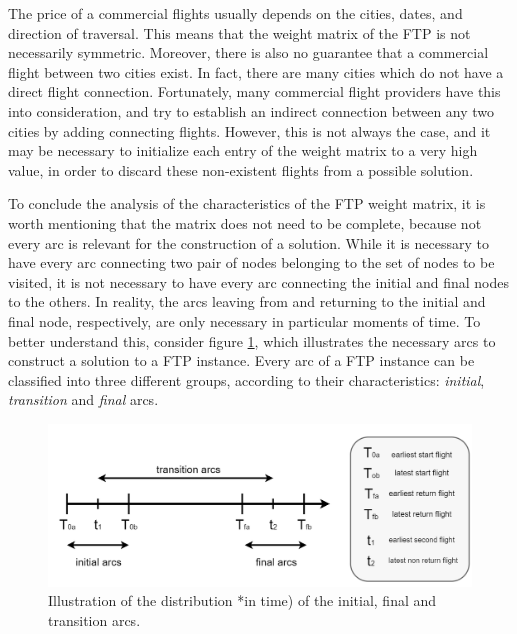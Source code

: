 The price of a commercial flights usually depends on the cities, dates, and  direction of traversal. This means that the weight matrix of the FTP is not necessarily symmetric. Moreover, there is also no guarantee that a commercial flight between two cities exist. In fact, there are many cities which do not have a direct flight connection. Fortunately, many commercial flight providers have this into consideration, and try to establish an indirect connection between any two cities by adding connecting flights. However, this is not always the case, and it may be necessary to initialize each entry of the weight matrix to a very high value, in order to discard these non-existent flights from a possible solution.  

To conclude the analysis of the characteristics of the FTP weight matrix, it is worth mentioning that the matrix does not need to be complete, because not every arc is relevant for the construction of a solution. While it is necessary to have every arc connecting two pair of nodes belonging to the set of nodes to be visited, it is not necessary to have every arc connecting the initial and final nodes to the others. In reality, the arcs leaving from and returning to the initial and final node, respectively, are only necessary in particular moments of time. To better understand this, consider figure \ref{fig:arc_families}, which illustrates the necessary arcs to construct a solution to a FTP instance. Every arc of a FTP instance can be classified into three different groups, according to their characteristics: \textit{initial}, \textit{transition} and \textit{final} arcs.

\begin{figure}[htpb]
  \centering
  \includegraphics[width=\textwidth]{./Figures/system_design/flights_times.png}
  \caption{Illustration of the distribution *in time) of the initial, final and transition arcs.}
  \label{fig:arc_families} 
\end{figure}


